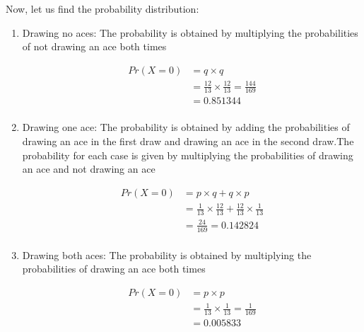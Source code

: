 \documentclass[journal,12pt,twocolumn]{IEEEtran}
\begin{document}
\section*{}
Now, let us find the probability distribution:
\begin{enumerate}
    \item Drawing no aces:
    The probability is obtained by multiplying the probabilities of not drawing an ace both times
    
    \begin{align}
        Pr(X=0) &= q \times q\\
        &= \frac{12}{13}\times\frac{12}{13} = \frac{144}{169}\\
        &= 0.851344\\\nonumber
    \end{align}
    \item Drawing one ace:
    The probability is obtained by adding the probabilities of drawing an ace in the first draw and drawing an ace in the second draw.The probability for each case is given by multiplying the probabilities of drawing an ace and not drawing an ace
    
    \begin{align}
        Pr(X=0) &= p \times q + q \times p\\
        &= \frac{1}{13}\times\frac{12}{13} + \frac{12}{13}\times\frac{1}{13}\nonumber\\
        &= \frac{24}{169} = 0.142824\\\nonumber
    \end{align}
    \item Drawing both aces:
    The probability is obtained by multiplying the probabilities of drawing an ace both times
    
    \begin{align}
        Pr(X=0) &= p \times p\\
        &= \frac{1}{13}\times\frac{1}{13} = \frac{1}{169}\\
        &= 0.005833\\\nonumber
    \end{align}
\end{enumerate}
\end{document}
